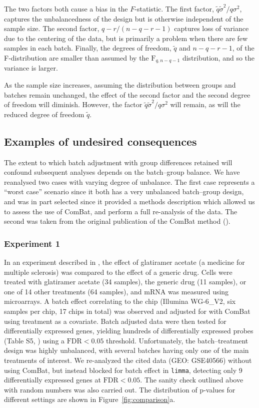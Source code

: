\documentclass{bio}
\begin{document}
The two factors both cause a bias in the $F$-statistic. The first factor, $\tilde q\tilde\sigma^2/q\sigma^2$, captures the unbalancedness of the design but is otherwise independent of the sample size. The second factor, $q-r/(n-q-r-1)$ captures loss of variance due to the centering of the data, but is primarily a problem when there are few samples in each batch. Finally, the degrees of freedom, $\tilde q$ and $n-q-r-1$, of the F-distribution are smaller than assumed by the $\text{F}_{q,n-q-1}$ distribution, and so the variance is larger.

As the sample size increases, assuming the distribution between groups and batches remain unchanged, the effect of the second factor and the second degree of freedom will diminish. However, the factor $\tilde q\tilde\sigma^2/q\sigma^2$ will remain, as will the reduced degree of freedom $\tilde q$.


\subsection{Examples of undesired consequences}

The extent to which batch adjustment with group differences retained will confound subsequent analyses depends on the batch--group balance. We have reanalysed two cases with varying degree of unbalance. The first case represents a ``worst case'' scenario since it both has a very unbalanced batch--group design, and was in part selected since it provided a methods description which allowed us to assess the use of ComBat, and perform a full re-analysis of the data. The second was taken from the original publication of the ComBat method (\citealp{Johnson2007}).

\subsubsection{Experiment 1}

In an experiment described in \citet{Towfic2014}, the effect of glatiramer acetate (a medicine for multiple sclerosis) was compared to the effect of a generic drug. Cells were treated with glatiramer acetate (34 samples), the generic drug (11 samples), or one of 14 other treatments (64 samples), and mRNA was measured using microarrays. A batch effect correlating to the chip (Illumina WG-6\_V2, six samples per chip, 17 chips in total) was observed and adjusted for with ComBat using treatment as a covariate. Batch adjusted data were then tested for differentially expressed genes, yielding hundreds of differentially expressed probes (Table S5, \citealp{Towfic2014}) using a $\text{FDR}<0.05$ threshold. Unfortunately, the batch--treatment design was highly unbalanced, with several batches having only one of the main treatments of interest. We re-analyzed the cited data (GEO: GSE40566) without using ComBat, but instead blocked for batch effect in \texttt{limma}, detecting only 9 differentially expressed genes at $\text{FDR}<0.05$. The sanity check  outlined above with random numbers was also carried out. The distribution of p-values for different settings are shown in Figure~\ref{fig:comparison}a.
\end{document}
